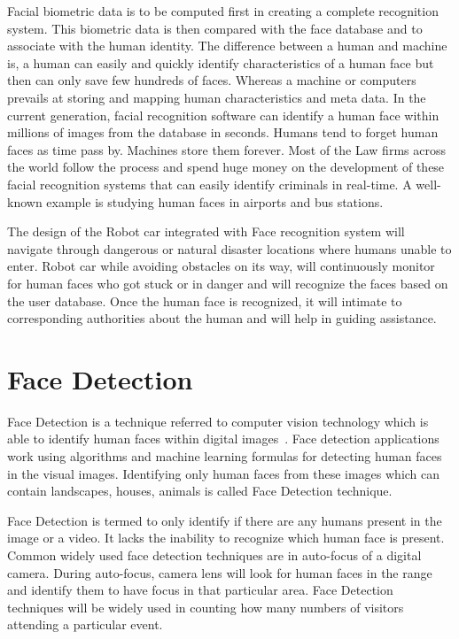 Facial biometric data is to be computed first in creating a complete 
recognition system. This biometric data is then compared with the face 
database and to associate with the human identity. The difference between 
a human and machine is, a human can easily and quickly identify 
characteristics of a human face but then can only save few hundreds of faces. 
Whereas a machine or computers prevails at storing and mapping human 
characteristics and meta data. In the current generation, facial recognition 
software can identify a human face within millions of images from the 
database in seconds. Humans tend to forget human faces as time pass by. 
Machines store them forever. Most of the Law firms across the world follow the 
process and spend huge money on the development of these facial recognition 
systems that can easily identify criminals in real-time. A well-known example 
is studying human faces in airports and bus stations.

The design of the Robot car integrated with Face recognition system will 
navigate through dangerous or natural disaster locations where humans 
unable to enter. Robot car while avoiding obstacles on its way, will 
continuously monitor for human faces who got stuck or in danger and will 
recognize the faces based on the user database. Once the human face is 
recognized, it will intimate to corresponding authorities about the human 
and will help in guiding assistance. 

\section{Face Detection}
Face Detection is a technique referred to computer vision technology which 
is able to identify human faces within digital images~\cite{divya2013}. Face 
detection applications work using algorithms and machine learning formulas 
for detecting human faces in the visual images. Identifying only human faces 
from these images which can contain landscapes, houses, animals is called 
Face Detection technique.

Face Detection is termed to only identify if there are any humans present in 
the image or a video. It lacks the inability to recognize which human face is 
present. Common widely used face detection techniques are in auto-focus of a 
digital camera. During auto-focus, camera lens will look for human faces in 
the range and identify them to have focus in that particular area.
Face Detection techniques will be widely used in counting how many numbers 
of visitors attending a particular event.

